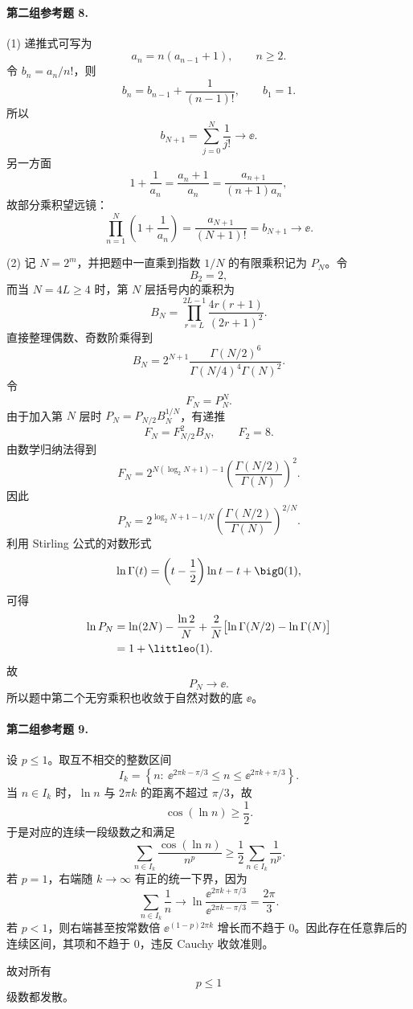 \paragraph{第二组参考题 8.}
\begin{xsolution}
(1) 递推式可写为
\[
 a_n=n(a_{n-1}+1),\qquad n\geq2.
\]
令 $b_n=a_n/n!$，则
\[
 b_n=b_{n-1}+\frac1{(n-1)!},
 \qquad b_1=1.
\]
所以
\[
 b_{N+1}=\sum_{j=0}^{N}\frac1{j!}\longrightarrow\ee.
\]
另一方面
\[
 1+\frac1{a_n}=\frac{a_n+1}{a_n}=\frac{a_{n+1}}{(n+1)a_n},
\]
故部分乘积望远镜：
\[
 \prod_{n=1}^{N}\left(1+\frac1{a_n}\right)
 =\frac{a_{N+1}}{(N+1)!}=b_{N+1}\longrightarrow\ee.
\]

(2) 记 $N=2^m$，并把题中一直乘到指数 $1/N$ 的有限乘积记为 $P_N$。令
\[
 B_2=2,
\]
而当 $N=4L\geq4$ 时，第 $N$ 层括号内的乘积为
\[
 B_N=\prod_{r=L}^{2L-1}\frac{4r(r+1)}{(2r+1)^2}.
\]
直接整理偶数、奇数阶乘得到
\[
 B_N
 =2^{N+1}\frac{\Gamma(N/2)^6}{\Gamma(N/4)^4\Gamma(N)^2}.
\]
令
\[
 F_N=P_N^N.
\]
由于加入第 $N$ 层时 $P_N=P_{N/2}B_N^{1/N}$，有递推
\[
 F_N=F_{N/2}^2B_N,
 \qquad F_2=8.
\]
由数学归纳法得到
\[
 F_N
 =2^{N(\log_2N+1)-1}
 \left(\frac{\Gamma(N/2)}{\Gamma(N)}\right)^2.
\]
因此
\[
 P_N
 =2^{\log_2N+1-1/N}
 \left(\frac{\Gamma(N/2)}{\Gamma(N)}\right)^{2/N}.
\]
利用 Stirling 公式的对数形式
\[
 \ln\Gamma(t)=\left(t-\frac12\right)\ln t-t+\bigO(1),
\]
可得
\[
 \begin{aligned}
 \ln P_N
 &=\ln(2N)-\frac{\ln2}{N}
 +\frac2N\bigl[\ln\Gamma(N/2)-\ln\Gamma(N)\bigr]\\
 &=1+\littleo(1).
\end{aligned}
\]
故
\[
 \boxed{P_N\longrightarrow\ee}.
\]
所以题中第二个无穷乘积也收敛于自然对数的底 $\ee$。
\end{xsolution}

\paragraph{第二组参考题 9.}
\begin{xsolution}
设 $p\leq1$。取互不相交的整数区间
\[
 I_k=\left\{n:\ \ee^{2\pi k-\pi/3}\leq n\leq\ee^{2\pi k+\pi/3}\right\}.
\]
当 $n\in I_k$ 时，$\ln n$ 与 $2\pi k$ 的距离不超过 $\pi/3$，故
\[
 \cos(\ln n)\geq\frac12.
\]
于是对应的连续一段级数之和满足
\[
 \sum_{n\in I_k}\frac{\cos(\ln n)}{n^p}
 \geq\frac12\sum_{n\in I_k}\frac1{n^p}.
\]
若 $p=1$，右端随 $k\to\infty$ 有正的统一下界，因为
\[
 \sum_{n\in I_k}\frac1n
 \longrightarrow \ln\frac{\ee^{2\pi k+\pi/3}}{\ee^{2\pi k-\pi/3}}
 =\frac{2\pi}{3}.
\]
若 $p<1$，则右端甚至按常数倍 $\ee^{(1-p)2\pi k}$ 增长而不趋于 $0$。因此存在任意靠后的连续区间，其项和不趋于 $0$，违反 Cauchy 收敛准则。

故对所有
\[
 \boxed{p\leq1}
\]
级数都发散。
\end{xsolution}


